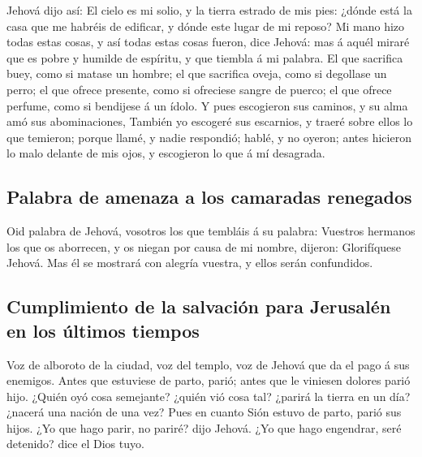 Jehová dijo así: El cielo es mi solio, y la tierra
estrado de mis pies: ¿dónde está la casa que me habréis de edificar, y
dónde este lugar de mi reposo?  Mi mano hizo todas estas
cosas, y así todas estas cosas fueron, dice Jehová: mas á aquél miraré
que es pobre y humilde de espíritu, y que tiembla á mi palabra.
 El que sacrifica buey, como si matase un hombre; el que
sacrifica oveja, como si degollase un perro; el que ofrece presente,
como si ofreciese sangre de puerco; el que ofrece perfume, como si
bendijese á un ídolo. Y pues escogieron sus caminos, y su alma amó sus
abominaciones,  También yo escogeré sus escarnios, y
traeré sobre ellos lo que temieron; porque llamé, y nadie respondió;
hablé, y no oyeron; antes hicieron lo malo delante de mis ojos, y
escogieron lo que á mí desagrada.

\hypertarget{palabra-de-amenaza-a-los-camaradas-renegados}{%
\subsection{Palabra de amenaza a los camaradas
renegados}\label{palabra-de-amenaza-a-los-camaradas-renegados}}

 Oid palabra de Jehová, vosotros los que tembláis á su
palabra: Vuestros hermanos los que os aborrecen, y os niegan por causa
de mi nombre, dijeron: Glorifíquese Jehová. Mas él se mostrará con
alegría vuestra, y ellos serán confundidos.

\hypertarget{cumplimiento-de-la-salvaciuxf3n-para-jerusaluxe9n-en-los-uxfaltimos-tiempos}{%
\subsection{Cumplimiento de la salvación para Jerusalén en los últimos
tiempos}\label{cumplimiento-de-la-salvaciuxf3n-para-jerusaluxe9n-en-los-uxfaltimos-tiempos}}

 Voz de alboroto de la ciudad, voz del templo, voz de
Jehová que da el pago á sus enemigos.  Antes que estuviese
de parto, parió; antes que le viniesen dolores parió hijo.
 ¿Quién oyó cosa semejante? ¿quién vió cosa tal? ¿parirá
la tierra en un día? ¿nacerá una nación de una vez? Pues en cuanto Sión
estuvo de parto, parió sus hijos.  ¿Yo que hago parir, no
pariré? dijo Jehová. ¿Yo que hago engendrar, seré detenido? dice el Dios
tuyo.

